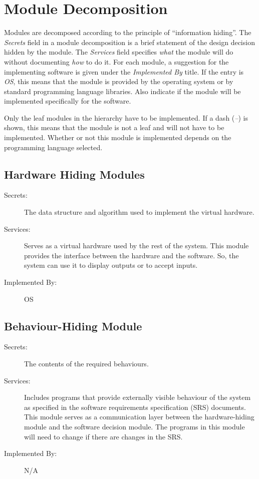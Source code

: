 \documentclass[12pt, titlepage]{article}
\begin{document}
\section{Module Decomposition} \label{SecMD}

Modules are decomposed according to the principle of ``information hiding''. The \emph{Secrets} field in a module
decomposition is a brief statement of the design decision hidden by the
module. The \emph{Services} field specifies \emph{what} the module will do
without documenting \emph{how} to do it. For each module, a suggestion for the
implementing software is given under the \emph{Implemented By} title. If the
entry is \emph{OS}, this means that the module is provided by the operating
system or by standard programming language libraries.  Also indicate if the
module will be implemented specifically for the software.

Only the leaf modules in the
hierarchy have to be implemented. If a dash (\emph{--}) is shown, this means
that the module is not a leaf and will not have to be implemented. Whether or
not this module is implemented depends on the programming language
selected.

\subsection{Hardware Hiding Modules}

\begin{description}
\item[Secrets:]The data structure and algorithm used to implement the virtual
  hardware.
\item[Services:]Serves as a virtual hardware used by the rest of the
  system. This module provides the interface between the hardware and the
  software. So, the system can use it to display outputs or to accept inputs.
\item[Implemented By:] OS
\end{description}

\subsection{Behaviour-Hiding Module}

\begin{description}
\item[Secrets:]The contents of the required behaviours.
\item[Services:]Includes programs that provide externally visible behaviour of
  the system as specified in the software requirements specification (SRS)
  documents. This module serves as a communication layer between the
  hardware-hiding module and the software decision module. The programs in this
  module will need to change if there are changes in the SRS.
\item[Implemented By:] N/A
\end{description}
\end{document}
